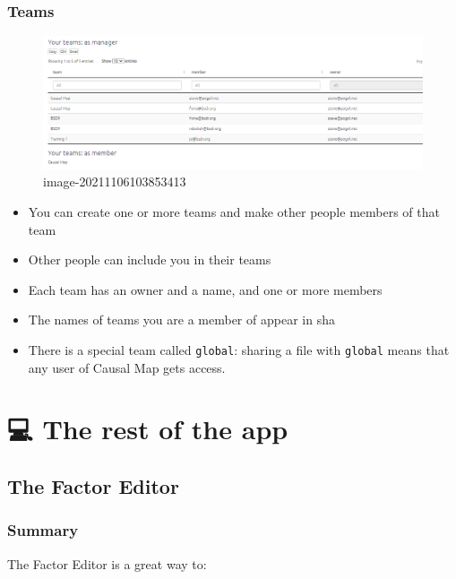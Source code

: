 \documentclass[
]{book}
\providecommand{\tightlist}{%
  \setlength{\itemsep}{0pt}\setlength{\parskip}{0pt}}
\begin{document}
\hypertarget{teams}{%
\section{Teams}\label{teams}}

\begin{figure}
\centering
\includegraphics{_assets/image-20211106103853413.png}
\caption{image-20211106103853413}
\end{figure}

\begin{itemize}
\tightlist
\item
  You can create one or more teams and make other people members of that team
\item
  Other people can include you in their teams
\item
  Each team has an owner and a name, and one or more members
\item
  The names of teams you are a member of appear in sha
\item
  There is a special team called \texttt{global}: sharing a file with \texttt{global} means that any user of Causal Map gets access.
\end{itemize}

\hypertarget{part-the-rest-of-the-app}{%
\part{💻 The rest of the app}\label{part-the-rest-of-the-app}}

\hypertarget{xfactor-editor}{%
\chapter{The Factor Editor}\label{xfactor-editor}}

\hypertarget{summary}{%
\section{Summary}\label{summary}}

The Factor Editor is a great way to:
\end{document}
